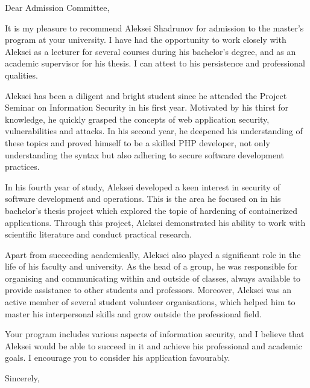 \documentclass{letter}
\begin{document}
\signature{V. V. Bashun \\ Assistant Professor \\ HSE University \\ \url{vbashun@hse.ru}}

\begin{letter}{}
\opening{Dear Admission Committee,}

It is my pleasure to recommend Aleksei Shadrunov for admission to the master's program at your university. I have had the opportunity to work closely with Aleksei as a lecturer for several courses during his bachelor's degree, and as an academic supervisor for his thesis. I can attest to his persistence and professional qualities.

Aleksei has been a diligent and bright student since he attended the Project Seminar on Information Security in his first year. Motivated by his thirst for knowledge, he quickly grasped the concepts of web application security, vulnerabilities and attacks. In his second year, he deepened his understanding of these topics and proved himself to be a skilled PHP developer, not only understanding the syntax but also adhering to secure software development practices.

In his fourth year of study, Aleksei developed a keen interest in security of software development and operations. This is the area he focused on in his bachelor's thesis project which explored the topic of hardening of containerized applications. Through this project, Aleksei demonstrated his ability to work with scientific literature and conduct practical research.

Apart from succeeding academically, Aleksei also played a significant role in the life of his faculty and university. As the head of a group, he was responsible for organising and communicating within and outside of classes, always available to provide assistance to other students and professors. Moreover, Aleksei was an active member of several student volunteer organisations, which helped him to master his interpersonal skills and grow outside the professional field.

Your program includes various aspects of information security, and I believe that Aleksei would be able to succeed in it and achieve his professional and academic goals. I encourage you to consider his application favourably.

\closing{Sincerely,}


\end{letter}
\end{document}
